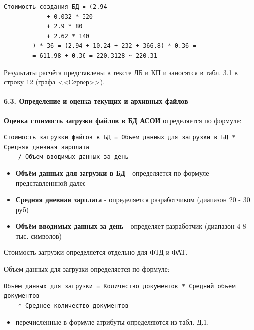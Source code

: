 \documentclass[12pt, a4paper, simple]{eskdtext}
\begin{document}
    \begin{lstlisting}[language=MyFormula]
        Стоимость создания БД = (2.94
            + 0.032 * 320
            + 2.9 * 80
            + 2.62 * 140
        ) * 36 = (2.94 + 10.24 + 232 + 366.8) * 0.36 =
        = 611.98 + 0.36 = 220.3128 ~ 220.31
\end{lstlisting}

    Результаты расчёта представлены в тексте ЛБ и КП и заносятся в табл. 3.1 в строку 12 (графа <<Сервер>>).

    \paragraph{6.3. Определение и оценка текущих и архивных файлов} \hspace{0pt}

    \textbf{Оценка стоимость загрузки файлов в БД АСОИ} определяется по формуле:

    \begin{lstlisting}[language=Formula]
Стоимость загрузки файлов в БД = Объем данных для загрузки в БД * Средняя дневная зарплата
    / Объем вводимых данных за день
\end{lstlisting}

    \begin{itemize}
        \item \textbf{Объём данных для загрузки в БД} - определяется по формуле представленнной далее
        \item \textbf{Средняя дневная зарплата} - определяется разработчиком (диапазон 20 - 30 руб)
        \item \textbf{Объём вводимых данных за день} - определяет разработчик (диапазон 4-8 тыс. символов)
    \end{itemize}    

    Стоимость загрузки определяется отдельно для ФТД и ФАТ.

    Объем данных для загрузки определяется по формуле:

    \begin{lstlisting}[language=Formula]
Объём данных для загрузки = Количество документов * Средний объем документов
    * Среднее количество документов
\end{lstlisting}

    \begin{itemize}
        \item перечисленные в формуле атрибуты определяются из табл. Д.1.
    \end{itemize} 
\end{document}
